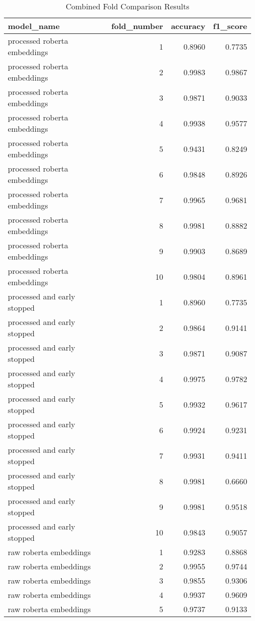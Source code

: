 \begin{table}
\caption{Combined Fold Comparison Results}
\label{tab:fold_comparison}
\begin{tabular}{lrrr}
\toprule
model_name & fold_number & accuracy & f1_score \\
\midrule
processed roberta embeddings & 1 & 0.8960 & 0.7735 \\
processed roberta embeddings & 2 & 0.9983 & 0.9867 \\
processed roberta embeddings & 3 & 0.9871 & 0.9033 \\
processed roberta embeddings & 4 & 0.9938 & 0.9577 \\
processed roberta embeddings & 5 & 0.9431 & 0.8249 \\
processed roberta embeddings & 6 & 0.9848 & 0.8926 \\
processed roberta embeddings & 7 & 0.9965 & 0.9681 \\
processed roberta embeddings & 8 & 0.9981 & 0.8882 \\
processed roberta embeddings & 9 & 0.9903 & 0.8689 \\
processed roberta embeddings & 10 & 0.9804 & 0.8961 \\
processed and early stopped & 1 & 0.8960 & 0.7735 \\
processed and early stopped & 2 & 0.9864 & 0.9141 \\
processed and early stopped & 3 & 0.9871 & 0.9087 \\
processed and early stopped & 4 & 0.9975 & 0.9782 \\
processed and early stopped & 5 & 0.9932 & 0.9617 \\
processed and early stopped & 6 & 0.9924 & 0.9231 \\
processed and early stopped & 7 & 0.9931 & 0.9411 \\
processed and early stopped & 8 & 0.9981 & 0.6660 \\
processed and early stopped & 9 & 0.9981 & 0.9518 \\
processed and early stopped & 10 & 0.9843 & 0.9057 \\
raw roberta embeddings & 1 & 0.9283 & 0.8868 \\
raw roberta embeddings & 2 & 0.9955 & 0.9744 \\
raw roberta embeddings & 3 & 0.9855 & 0.9306 \\
raw roberta embeddings & 4 & 0.9937 & 0.9609 \\
raw roberta embeddings & 5 & 0.9737 & 0.9133 \\

\end{tabular}
\end{table}
